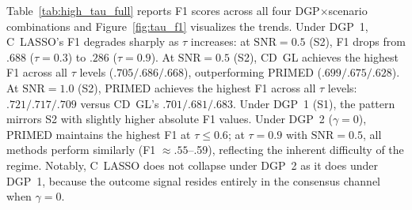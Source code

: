 \documentclass[referee,lineno,pdflatex,sn-vancouver-num]{sn-jnl}
\begin{document}
Table~\ref{tab:high_tau_full} reports F1 scores across all four DGP$\times$scenario combinations and Figure~\ref{fig:tau_f1} visualizes the trends.
Under DGP~1, C~LASSO's F1 degrades sharply as $\tau$ increases: at $\mathrm{SNR} = 0.5$ (S2), F1 drops from $.688$ ($\tau = 0.3$) to $.286$ ($\tau = 0.9$).
At $\mathrm{SNR} = 0.5$ (S2), CD~GL achieves the highest F1 across all $\tau$ levels ($.705/.686/.668$), outperforming PRIMED ($.699/.675/.628$).
At $\mathrm{SNR} = 1.0$ (S2), PRIMED achieves the highest F1 across all $\tau$ levels: $.721/.717/.709$ versus CD~GL's $.701/.681/.683$.
Under DGP~1 (S1), the pattern mirrors S2 with slightly higher absolute F1 values.
Under DGP~2 ($\gamma = 0$), PRIMED maintains the highest F1 at $\tau \leq 0.6$; at $\tau = 0.9$ with $\mathrm{SNR} = 0.5$, all methods perform similarly (F1 $\approx .55$--.59), reflecting the inherent difficulty of the regime.
Notably, C~LASSO does not collapse under DGP~2 as it does under DGP~1, because the outcome signal resides entirely in the consensus channel when $\gamma = 0$.
\end{document}
